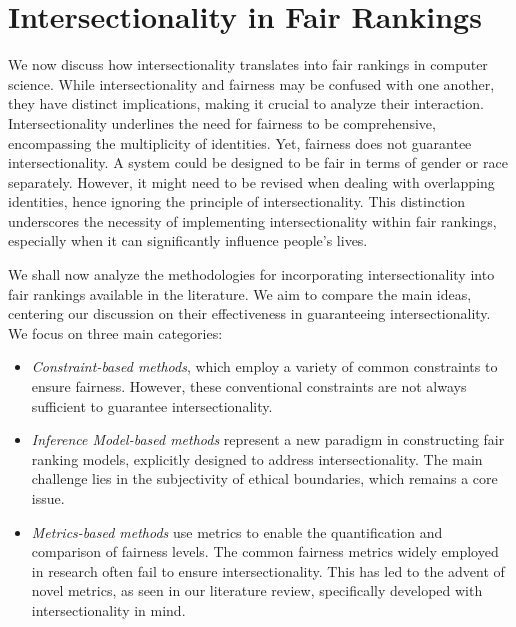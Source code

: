 \section{Intersectionality in Fair Rankings}
\label{ch:intersectionality_in_fair_rankings}%

We now discuss how intersectionality translates into fair rankings in computer science. 
%
While intersectionality and fairness may be confused with one another, they have distinct implications, making it crucial to analyze their interaction.
Intersectionality underlines the need for fairness to be comprehensive, encompassing the multiplicity of identities. Yet, fairness does not guarantee intersectionality.
A system could be designed to be fair in terms of gender or race separately. However, it might need to be revised when dealing with overlapping identities, hence ignoring the principle of intersectionality. This distinction underscores the necessity of implementing intersectionality within fair rankings, especially when it can significantly influence people's lives.

We shall now analyze the methodologies for incorporating intersectionality into fair rankings available in the literature. We aim to compare the main ideas, centering our discussion on their effectiveness in guaranteeing intersectionality. We focus on three main categories:


\begin{itemize}
  \item \emph{Constraint-based methods}, which employ a variety of common constraints to ensure fairness. However, these conventional constraints are not always sufficient to guarantee intersectionality.
  
  \item \emph{Inference Model-based methods} represent a new paradigm in constructing fair ranking models, explicitly designed to address intersectionality. The main challenge lies in the subjectivity of ethical boundaries, which remains a core issue.
  
  \item \emph{Metrics-based methods} use metrics to enable the quantification and comparison of fairness levels. The common fairness metrics widely employed in research often fail to ensure intersectionality. This has led to the advent of novel metrics, as seen in our literature review, specifically developed with intersectionality in mind.
\end{itemize}

